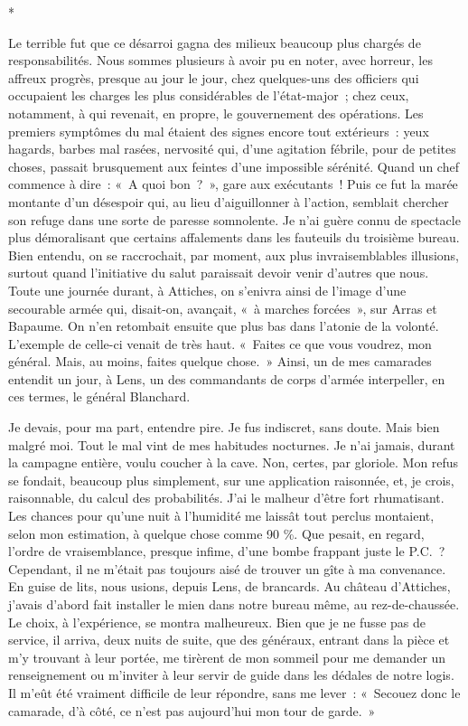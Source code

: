 \documentclass[french,twoside]{book} %
\begin{document}
\begin{center}
*\end{center}
\noindent Le terrible fut que ce désarroi gagna des milieux beaucoup plus chargés de responsabilités. Nous sommes plusieurs à avoir pu en noter, avec horreur, les affreux progrès, presque au jour le jour, chez quelques-uns des officiers qui occupaient les charges les plus considérables de l’état-major ; chez ceux, notamment, à qui revenait, en propre, le gouvernement des opérations. Les premiers symptômes du mal étaient des signes encore tout extérieurs : yeux   hagards, barbes mal rasées, nervosité qui, d’une agitation fébrile, pour de petites choses, passait brusquement aux feintes d’une impossible sérénité. Quand un chef commence à dire : « A quoi bon ? », gare aux exécutants ! Puis ce fut la marée montante d’un désespoir qui, au lieu d’aiguillonner à l’action, semblait chercher son refuge dans une sorte de paresse somnolente. Je n’ai guère connu de spectacle plus démoralisant que certains affalements dans les fauteuils du troisième bureau. Bien entendu, on se raccrochait, par moment, aux plus invraisemblables illusions, surtout quand l’initiative du salut paraissait devoir venir d’autres que nous. Toute une journée durant, à Attiches, on s’enivra ainsi de l’image d’une secourable armée qui, disait-on, avançait, « à marches forcées », sur Arras et Bapaume. On n’en retombait ensuite que plus bas dans l’atonie de la volonté. L’exemple de celle-ci venait de très haut. « Faites ce que vous voudrez, mon général. Mais, au moins, faites quelque chose. » Ainsi, un de mes camarades entendit un jour, à Lens, un des commandants de corps d’armée interpeller, en ces termes, le général Blanchard.\par
Je devais, pour ma part, entendre pire. Je fus indiscret, sans doute. Mais bien malgré moi. Tout le mal vint de mes habitudes nocturnes. Je n’ai jamais, durant la campagne entière, voulu coucher à la cave. Non, certes, par gloriole. Mon refus se fondait, beaucoup plus simplement, sur une application raisonnée, et, je crois, raisonnable, du calcul des probabilités. J’ai le malheur d’être fort rhumatisant. Les chances pour qu’une nuit à l’humidité me laissât tout perclus montaient, selon mon estimation, à quelque chose comme 90 \%. Que pesait, en regard, l’ordre de vraisemblance, presque infime, d’une bombe frappant juste le P.C. ? Cependant, il ne m’était pas toujours aisé de trouver un gîte à ma convenance. En guise de lits, nous usions, depuis Lens, de brancards. Au château d’Attiches, j’avais d’abord fait installer le   mien dans notre bureau même, au rez-de-chaussée. Le choix, à l’expérience, se montra malheureux. Bien que je ne fusse pas de service, il arriva, deux nuits de suite, que des généraux, entrant dans la pièce et m’y trouvant à leur portée, me tirèrent de mon sommeil pour me demander un renseignement ou m’inviter à leur servir de guide dans les dédales de notre logis. Il m’eût été vraiment difficile de leur répondre, sans me lever : « Secouez donc le camarade, d’à côté, ce n’est pas aujourd’hui mon tour de garde. »\par
\end{document}
